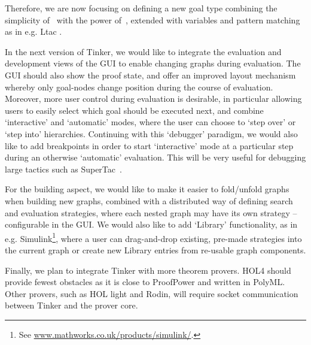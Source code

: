\documentclass[submission,copyright,creativecommons]{eptcs}
\begin{document}
Therefore, we are now focusing on defining a new goal type combining the simplicity of~\cite{LPAR13} with the power of~\cite{grov13a}, extended with variables and pattern matching as in e.g. {\cal L}tac \cite{Delahaye02}.

In the next version of Tinker, we would like to integrate the evaluation and development views of the GUI to enable changing graphs during evaluation.
The GUI should also show the proof state, and offer an improved layout mechanism whereby only goal-nodes change position during the course of evaluation. Moreover, more user control during evaluation is desirable, in particular allowing users to easily select which goal should be executed next, and combine `interactive' and `automatic' modes, where the user can choose to `step over' or `step into' hierarchies. Continuing with this `debugger' paradigm, we would also like to add breakpoints in order to start `interactive' mode at a particular step during an otherwise `automatic' evaluation. This will be very useful for debugging large tactics such as SuperTac~\cite{OHalloran13}.

For the building aspect, we would like to make it easier to fold/unfold graphs when building new graphs, combined with a distributed way of defining search and evaluation strategies, where each nested graph may have its own strategy -- configurable in the GUI. We would also like to add `Library' functionality, as in e.g. Simulink\footnote{See \url{www.mathworks.co.uk/products/simulink/}.}, where a user can drag-and-drop existing, pre-made strategies into the current graph or create new Library entries from re-usable graph components.

Finally, we plan to integrate Tinker with more theorem provers. HOL4 should provide fewest obstacles as it is close to ProofPower and written in PolyML. Other provers, such as HOL light and Rodin, will require socket communication between Tinker and the prover core. 



\vspace{-15pt}

\begin{footnotesize}


\end{footnotesize}
\end{document}
